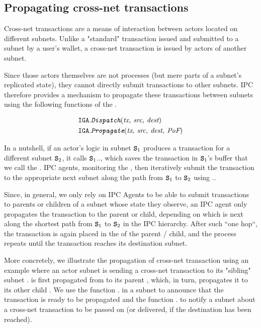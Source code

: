 \subsection{Propagating cross-net transactions}
\label{sec:cross-net-tx}

Cross-net transactions are a means of interaction between actors located on different subnets.
Unlike a "standard" transaction issued and submitted to a subnet by a user's wallet,
a cross-net transaction is issued by actors of another subnet.

Since those actors themselves are not processes (but mere parts of a subnet's replicated state),
they cannot directly submit transactions to other subnets.
IPC therefore provides a mechanism to propagate these transactions between subnets using the following functions of the \gw.

\begin{align*}
    \texttt{IGA}.&\textit{\texttt{Dispatch}}(\textit{tx, src, dest})\\
    \texttt{IGA}.&\textit{\texttt{Propagate}}(\textit{tx, src, dest, \textit{PoF}})
\end{align*}

In a nutshell, if an actor's logic in subnet $\textbf{\texttt{S}}_1$ produces a transaction for a different subnet $\textbf{\texttt{S}}_2$,
it calls $\textbf{\texttt{S}}_1$.\gw., which saves the transaction in $\textbf{\texttt{S}}_1$'s \gw buffer that we call the \postoffice.
IPC agents, monitoring the \postoffice, then iteratively submit the transaction to the appropriate next subnet along the path from $\textbf{\texttt{S}}_1$ to $\textbf{\texttt{S}}_2$ using \gw..

Since, in general, we only rely on IPC Agents to be able to submit transactions to parents or children of a subnet whose state they observe,
an IPC agent only propagates the transaction to the parent or child, depending on which is next along the shortest path from $\textbf{\texttt{S}}_1$ to $\textbf{\texttt{S}}_2$ in the IPC hierarchy.
After such ``one hop``, the transaction is again placed in the \postoffice of the parent / child, and the process repeats until the transaction reaches its destination subnet.

More concretely, we illustrate the propagation of cross-net transaction using an example where an actor subnet 
is sending a cross-net transaction  to its "sibling" subnet .
 is first propagated from  to its parent , which, in turn, propagates it to its other child .
We use the function \gw. in a subnet to announce that the transaction is ready to be propagated
and the function \gw. to notify a subnet about a cross-net transaction to be passed on (or delivered, if the destination has been reached).

